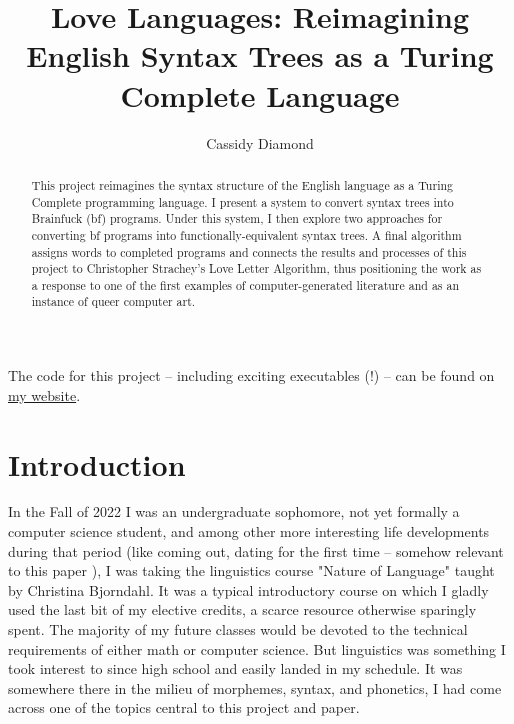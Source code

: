 \documentclass[runningheads]{llncs}
\begin{document}

\title{Love Languages: Reimagining English Syntax Trees as a Turing Complete Language}

\author{
	Cassidy Diamond
}



\maketitle

\begin{abstract}
	This project reimagines the syntax structure of the English language as a Turing Complete programming language. I present a system to convert syntax trees into Brainfuck (bf) programs. Under this system, I then explore two approaches for converting bf programs into functionally-equivalent syntax trees. A final algorithm assigns words to completed programs and connects the results and processes of this project to Christopher Strachey's Love Letter Algorithm, thus positioning the work as a response to one of the first examples of computer-generated literature and as an instance of queer computer art.
\end{abstract}

The code for this project -- including exciting executables (!) -- can be found on \href{https://example.com}{my website}. %
\section{Introduction}
In the Fall of 2022 I was an undergraduate sophomore, not yet formally a computer science student, and among other more interesting life developments during that period (like coming out, dating for the first time -- somehow relevant to this paper%
), I was taking the linguistics course "Nature of Language" taught by Christina Bjorndahl. It was a typical introductory course on which I gladly used the last bit of my elective credits, a scarce resource otherwise sparingly spent. The majority of my future classes would be devoted to the technical requirements of either math or computer science. But linguistics was something I took interest to since high school and easily landed in my schedule. It was somewhere there in the milieu of morphemes, syntax, and phonetics, I had come across one of the topics central to this project and paper.
\end{document}
